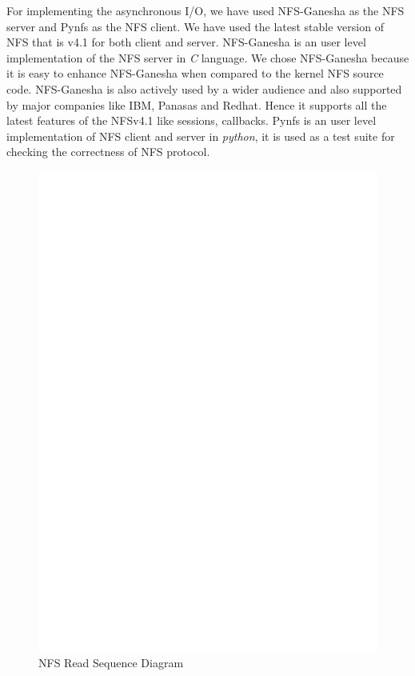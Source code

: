 For implementing the asynchronous I/O, we have used NFS-Ganesha \cite{ganesha} as the NFS server and Pynfs \cite{pynfs} as the NFS client. We have used the latest stable version of NFS that is v4.1 for both client and server. NFS-Ganesha is an user level implementation of the NFS server in \textit{C} language. We chose NFS-Ganesha because it is easy to enhance NFS-Ganesha when compared to the kernel NFS source code. NFS-Ganesha is also actively used by a wider audience and also supported by major companies like IBM, Panasas and Redhat. Hence it supports all the latest features of the NFSv4.1 like sessions, callbacks. Pynfs is an user level implementation of NFS client and server in \textit{python}, it is used as a test suite for checking the correctness of NFS protocol.

\begin{figure}
\centering
\includegraphics[scale=0.9]{figures/ReadSequence.eps}
\caption{NFS Read Sequence Diagram}
\label{fig:NFSRead}
\end{figure}

